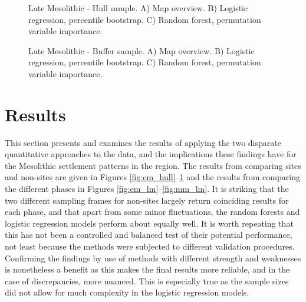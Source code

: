 \documentclass[12pt, a4paper]{article}
\begin{document}
\begin{figure}
	\caption[Late Mesolithic - Hull sample]{Late Mesolithic - Hull sample. A) Map overview. B) Logistic regression, percentile bootstrap. C) Random forest, permutation variable importance.}
	\label{fig:lm_hull}
\bigbreak
	\caption[Late Mesolithic - Buffer sample]{Late Mesolithic - Buffer sample. A) Map overview. B) Logistic regression, percentile bootstrap. C) Random forest, permutation variable importance.}
	\label{fig:lm_buff}
\end{figure}

\section{Results}
This section presents and examines the results of applying the two disparate quantitative approaches to the data, and the implications these findings have for the Mesolithic settlement patterns in the region. The results from comparing sites and non-sites are given in Figures \ref{fig:em_hull}--\ref{fig:lm_buff} and the results from comparing the different phases in Figures \ref{fig:em_lm}--\ref{fig:mm_lm}. It is striking that the two different sampling frames for non-sites largely return coinciding results for each phase, and that apart from some minor fluctuations, the random forests and logistic regression models perform about equally well. It is worth repeating that this has not been a controlled and balanced test of their potential performance, not least because the methods were subjected to different validation procedures. Confirming the findings by use of methods with different strength and weaknesses is nonetheless a benefit as this makes the final results more reliable, and in the case of discrepancies, more nuanced. This is especially true as the sample sizes did not allow for much complexity in the logistic regression models.\par
\end{document}
